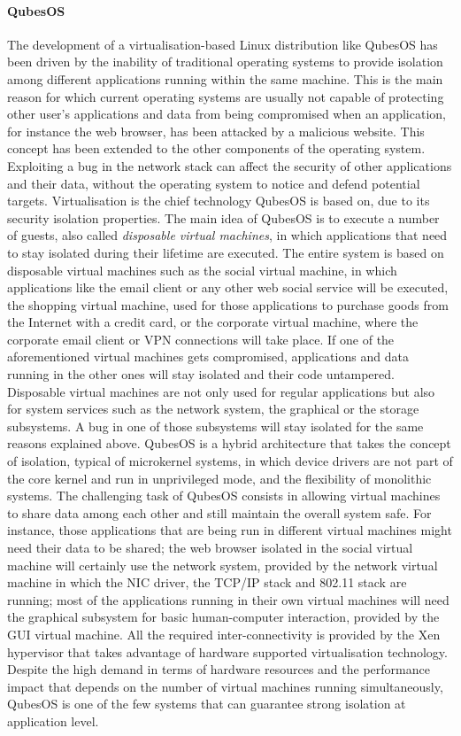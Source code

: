 \paragraph{QubesOS}
The development of a virtualisation-based Linux distribution like QubesOS \cite{qubesos} has been driven by the inability of traditional operating systems to provide isolation among different applications running within the same machine.  This is the main reason for which current operating systems are usually not capable of protecting other user's applications and data from being compromised when an application, for instance the web browser, has been attacked by a malicious website. 
This concept has been extended to the other components of the operating system. Exploiting a bug in the network stack can affect the security of other applications and their data, without the operating system to notice and defend potential targets.
Virtualisation is the chief technology QubesOS is based on, due to its security isolation properties. The main idea of QubesOS is to execute a number of guests, also called \emph{disposable virtual machines}, in which applications that need to stay isolated during their lifetime are executed. The entire system is based on disposable virtual machines such as the social virtual machine, in which applications like the email client or any other web social service will be executed, the shopping virtual machine, used for those applications to purchase goods from the Internet with a credit card, or the corporate virtual machine, where the corporate email client or VPN connections will take place. 
If one of the aforementioned virtual machines gets compromised, applications and data running in the other ones will stay isolated and their code untampered.
Disposable virtual machines are not only used for regular applications but also for system services such as the network system, the graphical or the storage subsystems. A bug in one of those subsystems will stay isolated for the same reasons explained above.
QubesOS is a hybrid architecture that takes the concept of isolation, typical of microkernel systems, in which device drivers are not part of the core kernel and run in unprivileged mode, and the flexibility of monolithic systems.
The challenging task of QubesOS consists in allowing virtual machines to share data among each other and still maintain the overall system safe. For instance, those applications that are being run in different virtual machines might need their data to be shared; the web browser isolated in the social virtual machine will certainly use the network system, provided by the network virtual machine in which the NIC driver, the TCP/IP stack and 802.11 stack are running; most of the applications running in their own virtual machines will need the graphical subsystem for basic human-computer interaction, provided by the GUI virtual machine. 
All the required inter-connectivity is provided by the Xen hypervisor that takes advantage of hardware supported virtualisation technology. Despite the high demand in terms of hardware resources and the performance impact that depends on the number of virtual machines running simultaneously, QubesOS is one of the few systems that can guarantee strong isolation at application level.

